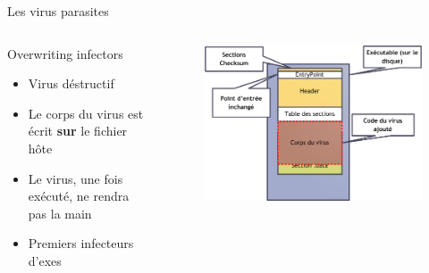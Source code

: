 \documentclass{beamer}
\begin{document}
\begin{frame}{Les virus parasites}
\begin{columns}[t]
\begin{column}{4cm}
\begin{exampleblock}{Overwriting infectors}
\begin{itemize}
\item Virus déstructif
\item Le corps du virus est écrit \textbf{sur} le fichier hôte
\item Le virus, une fois exécuté, ne rendra pas la main 
\item Premiers infecteurs d'exes
\end{itemize}
\end{exampleblock}
\end{column}
\begin{column}{6cm}
\begin{figure}[!ht]
\includegraphics[scale=0.3]{overwriting.png}
\center
\end{figure}
\end{column}
\end{columns}

\end{frame}
\end{document}
